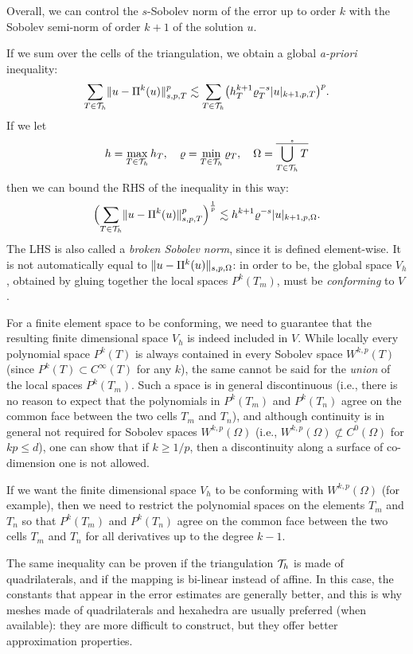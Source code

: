 Overall, we can control the $s$-Sobolev norm of the error up to order $k$ with the Sobolev semi-norm of order $k+1$ of the solution $u$.

If we sum over the cells of the triangulation, we obtain a global \emph{a-priori} inequality:
\[
\sum_{T \in \mathcal{T}_h} \lVert u- \Pi^k(u)\rVert_{s,p,T}^p \lesssim
\sum_{T \in \mathcal{T}_h} \bigl( h_T^{k+1} \varrho_T^{-s} \lvert u\rvert_{k+1,p,T} \bigr)^p.
\]
If we let
\[
h = \max_{T \in \mathcal{T}_h} h_T, \quad \varrho = \min_{T \in \mathcal{T}_h} \varrho_T, \quad \Omega = \mathring{\overline{\bigcup_{T \in \mathcal{T}_h} T}}
\]
then we can bound the RHS of the inequality in this way:
\[
\Bigl( \sum_{T \in \mathcal{T}_h} \lVert u- \Pi^k(u)\rVert_{s,p,T}^p \Bigr)^\frac{1}{p} \lesssim
h^{k+1} \varrho^{-s} \lvert u\rvert_{k+1,p,\Omega}.
\]
The LHS is also called a \emph{broken Sobolev norm}, since it is defined element-wise. It is not automatically equal to $\lVert u- \Pi^k(u)\rVert_{s,p,\Omega}$: in order to be, the global space $V_h$, obtained by gluing together the local spaces $P^k(T_m)$, must be \emph{conforming} to $V$. 

\begin{remark}[Conformity] For a finite element space to be conforming, we need to guarantee that the resulting finite dimensional space $V_h$ is indeed included in $V$. While locally every polynomial space $P^k(T)$ is always contained in every Sobolev space $W^{k,p}(T)$ (since $P^k(T) \subset C^{\infty}(T)$ for any $k$), the same cannot be said for the \emph{union} of the local spaces $P^k(T_m)$. Such a space is in general discontinuous (i.e., there is no reason to expect that the polynomials in $P^k(T_m)$ and $P^k(T_n)$ agree on the common face between the two cells $T_m$ and $T_n$), and although continuity is in general not required for Sobolev spaces $W^{k,p}(\Omega)$ (i.e., $W^{k,p}(\Omega)\not\subset C^0(\Omega)$ for $kp\leq d$), one can show that if $k \geq 1/p$, then a discontinuity along a surface of co-dimension one is not allowed.

If we want the finite dimensional space $V_h$ to be conforming with $W^{k,p}(\Omega)$ (for example), then we need to restrict the polynomial spaces on the elements $T_m$ and $T_n$ so that $P^k(T_m)$ and $P^k(T_n)$ agree on the common face between the two cells $T_m$ and $T_n$ for all derivatives up to the degree $k-1$.
\end{remark}

\begin{remark}
The same inequality can be proven if the triangulation $\mathcal{T}_h$ is made of quadrilaterals, and if the mapping is bi-linear instead of affine. In this case, the constants that appear in the error estimates are generally better, and this is why meshes made of quadrilaterals and hexahedra are usually preferred (when available): they are more difficult to construct, but they offer better approximation properties.
\end{remark}

